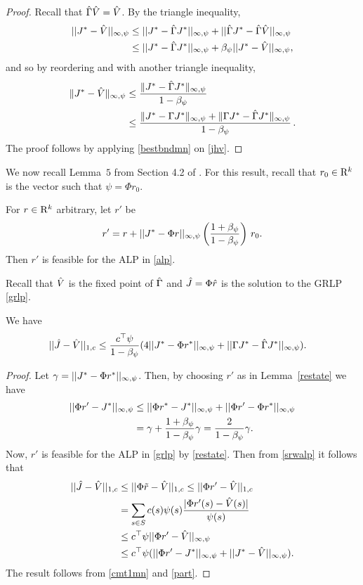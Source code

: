 \begin{proof}
Recall that $\hat{\Gamma} \hat{V}=\hat{V}$. By the triangle inequality,
\begin{align*}
||J^*-\hat{V}||_{\infty,\psi}
& \leq ||J^*-\hat{\Gamma} J^*||_{\infty,\psi}+||\hat{\Gamma} J^*-\hat{\Gamma} \hat{V}||_{\infty,\psi}\\
&\leq ||J^*-\hat{\Gamma} J^*||_{\infty,\psi}+\beta_\psi || J^*- \hat{V}||_{\infty,\psi},
\end{align*}
and so by reordering and with another triangle inequality,
\begin{align}\label{jhv}
\norm{J^*-\hv}_{\mn} \nn
&\le \frac{\norm{ J^*-\hg J^*}_{\mn}}{1-\beta_\psi}\nn\\
&\le \frac{\norm{ J^*-\Gamma J^*}_{\mn}+\norm{\Gamma J^* - \hg J^*}_{\mn}}{1-\beta_\psi}\,.
\end{align}
The proof follows by applying \cref{bestbndmn} on \eqref{jhv}.
\end{proof}
We now recall Lemma~$5$ from Section 4.2 of \cite{ALP}. 
For this result, recall that $r_0 \in \mathrm{R}^k$ is the vector such that $\psi = \Phi r_0$.
\begin{lemma}\label{restate}
For  $r \in \mathrm{R}^k$ arbitrary, let $r'$ be
\begin{align}
 r'= r+||J^*-\Phi r||_{\infty,\psi} \left(\frac{1+\beta_{\psi}}{1-\beta_{\psi}}\right)\, r_0.
\end{align}
Then $r'$ is feasible for the ALP in \eqref{alp}.
\end{lemma}
Recall that $\hat{V}$ is the fixed point of $\hat{\Gamma}$ and $\hat{J}=\Phi \hat{r}$ is the solution to the GRLP
\eqref{grlp}. 
\begin{theorem}\label{mt2mn}
We have
\begin{align}
||\hat{J}-\hat{V}||_{1,c}&\leq \frac{c^\top \psi}{1-\beta_\psi}(4||J^*-\Phi r^*||_{\infty,\psi}\nonumber
+||\Gamma J^*-\hat{\Gamma} J^*||_{\infty,\psi}).
\end{align}
\end{theorem}
\begin{proof}
Let $\gamma=||J^*-\Phi r^*||_{\infty,\psi}$. 
Then, by choosing $r'$ as in Lemma~\ref{restate} we have
\begin{align}
||\Phi r'-J^*||_{\mn}\nn
&\leq ||\Phi r^*-J^*||_{\mn}+||\Phi r'-\Phi r^*||_{\mn}\nn\\
&=\gamma+\frac{1+\beta_\psi}{1-\beta_\psi}\gamma
	=\frac{2}{1-\beta_\psi}\gamma.
\label{part}
\end{align}
Now, $r'$ is feasible for the ALP in \eqref{grlp} by \cref{restate}. 
Then from \cref{srwalp} it follows that
\begin{align}
||\hat{J}-\hat{V}||_{1,c}
&\leq||\Phi \tilde{r}-\hat{V}||_{1,c}\leq||\Phi r'-\hat{V}||_{1,c}\nonumber\\
&=\sum_{s\in S}c(s)\psi(s)\frac{|\Phi r'(s)-\hat{V}(s)|}{\psi(s)}\nonumber\\
&\leq c^\top \psi ||\Phi r'-\hat{V}||_{\infty,\psi}\nonumber\\
&\leq c^\top \psi (||\Phi r'-J^*||_{\infty,\psi}+||J^*-\hat{V}||_{\infty,\psi}).\nonumber
\end{align}
The result follows from \cref{cmt1mn} and \eqref{part}.
\end{proof}
